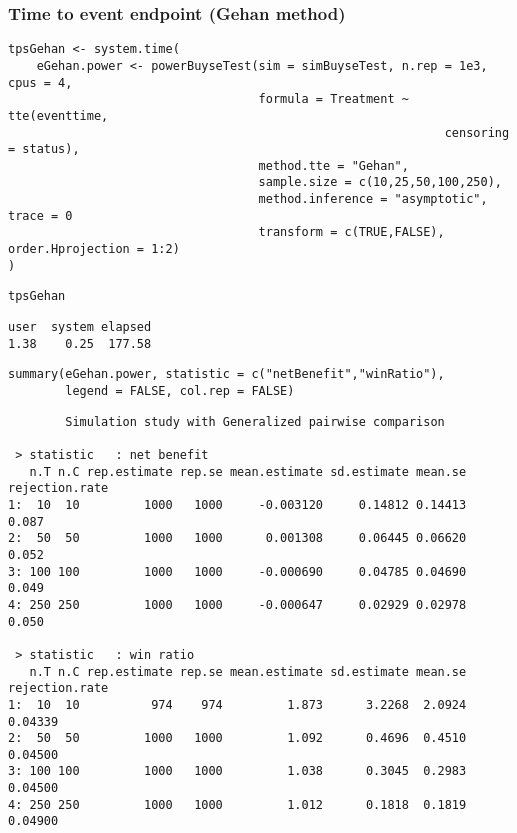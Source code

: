 \documentclass[12pt]{article}
\begin{document}
\clearpage

\subsubsection{Time to event endpoint (Gehan method)}
\label{sec:org349647b}
\lstset{language=r,label= ,caption= ,captionpos=b,numbers=none}
\begin{lstlisting}
tpsGehan <- system.time(
	eGehan.power <- powerBuyseTest(sim = simBuyseTest, n.rep = 1e3, cpus = 4,
								   formula = Treatment ~ tte(eventtime, 
															 censoring = status), 
								   method.tte = "Gehan",
								   sample.size = c(10,25,50,100,250), 
								   method.inference = "asymptotic", trace = 0
								   transform = c(TRUE,FALSE), order.Hprojection = 1:2)
)
\end{lstlisting}

\lstset{language=r,label= ,caption= ,captionpos=b,numbers=none}
\begin{lstlisting}
tpsGehan
\end{lstlisting}

\begin{verbatim}
user  system elapsed 
1.38    0.25  177.58
\end{verbatim}

\lstset{language=r,label= ,caption= ,captionpos=b,numbers=none}
\begin{lstlisting}
summary(eGehan.power, statistic = c("netBenefit","winRatio"), 
		legend = FALSE, col.rep = FALSE)
\end{lstlisting}

\begin{verbatim}
        Simulation study with Generalized pairwise comparison

 > statistic   : net benefit
   n.T n.C rep.estimate rep.se mean.estimate sd.estimate mean.se rejection.rate
1:  10  10         1000   1000     -0.003120     0.14812 0.14413          0.087
2:  50  50         1000   1000      0.001308     0.06445 0.06620          0.052
3: 100 100         1000   1000     -0.000690     0.04785 0.04690          0.049
4: 250 250         1000   1000     -0.000647     0.02929 0.02978          0.050

 > statistic   : win ratio
   n.T n.C rep.estimate rep.se mean.estimate sd.estimate mean.se rejection.rate
1:  10  10          974    974         1.873      3.2268  2.0924        0.04339
2:  50  50         1000   1000         1.092      0.4696  0.4510        0.04500
3: 100 100         1000   1000         1.038      0.3045  0.2983        0.04500
4: 250 250         1000   1000         1.012      0.1818  0.1819        0.04900
\end{verbatim}
\end{document}
